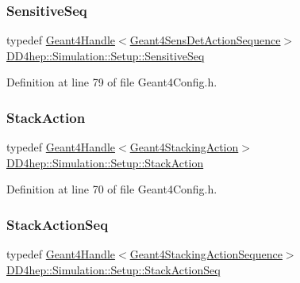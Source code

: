 \subsubsection{\texorpdfstring{Sensitive\+Seq}{SensitiveSeq}}
{\footnotesize\ttfamily typedef \hyperlink{class_d_d4hep_1_1_simulation_1_1_geant4_handle}{Geant4\+Handle}$<$\hyperlink{class_d_d4hep_1_1_simulation_1_1_geant4_sens_det_action_sequence}{Geant4\+Sens\+Det\+Action\+Sequence}$>$ \hyperlink{namespace_d_d4hep_1_1_simulation_1_1_setup_a92085f8dfd1adaa9d05d5aeeeb9380b2}{D\+D4hep\+::\+Simulation\+::\+Setup\+::\+Sensitive\+Seq}}



Definition at line 79 of file Geant4\+Config.\+h.

\hypertarget{namespace_d_d4hep_1_1_simulation_1_1_setup_a2656383b49e01ac46b211b6f30d17d5a}{}\label{namespace_d_d4hep_1_1_simulation_1_1_setup_a2656383b49e01ac46b211b6f30d17d5a} 
\subsubsection{\texorpdfstring{Stack\+Action}{StackAction}}
{\footnotesize\ttfamily typedef \hyperlink{class_d_d4hep_1_1_simulation_1_1_geant4_handle}{Geant4\+Handle}$<$\hyperlink{class_d_d4hep_1_1_simulation_1_1_geant4_stacking_action}{Geant4\+Stacking\+Action}$>$ \hyperlink{namespace_d_d4hep_1_1_simulation_1_1_setup_a2656383b49e01ac46b211b6f30d17d5a}{D\+D4hep\+::\+Simulation\+::\+Setup\+::\+Stack\+Action}}



Definition at line 70 of file Geant4\+Config.\+h.

\hypertarget{namespace_d_d4hep_1_1_simulation_1_1_setup_a4b1936ec223ba4447955c468db61490f}{}\label{namespace_d_d4hep_1_1_simulation_1_1_setup_a4b1936ec223ba4447955c468db61490f} 
\subsubsection{\texorpdfstring{Stack\+Action\+Seq}{StackActionSeq}}
{\footnotesize\ttfamily typedef \hyperlink{class_d_d4hep_1_1_simulation_1_1_geant4_handle}{Geant4\+Handle}$<$\hyperlink{class_d_d4hep_1_1_simulation_1_1_geant4_stacking_action_sequence}{Geant4\+Stacking\+Action\+Sequence}$>$ \hyperlink{namespace_d_d4hep_1_1_simulation_1_1_setup_a4b1936ec223ba4447955c468db61490f}{D\+D4hep\+::\+Simulation\+::\+Setup\+::\+Stack\+Action\+Seq}}



